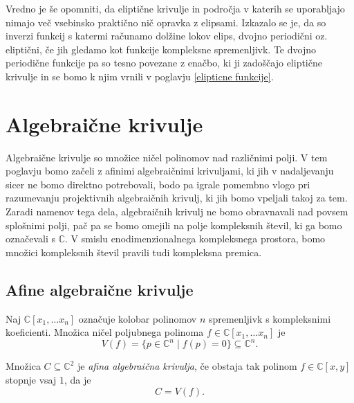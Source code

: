 \documentclass[mat1]{fmfdelo}
\newcommand{\C}{\mathbb C}
\begin{document}
Vredno je še opomniti, da eliptične krivulje in področja v katerih se uporabljajo 
nimajo več vsebinsko praktično nič opravka z elipsami. 
Izkazalo se je, da so inverzi funkcij s katermi računamo dolžine lokov elips, dvojno periodični oz. eliptični,
če jih gledamo kot funkcije kompleksne spremenljivk. Te dvojno periodične funkcije pa so tesno povezane z enačbo,
ki ji zadoščajo eliptične krivulje in se bomo k njim vrnili v poglavju \ref{elipticne funkcije}.


\section{Algebraične krivulje} \label{algebraicne krivulje}
Algebraične krivulje so množice ničel polinomov nad različnimi polji. V tem poglavju bomo začeli 
z afinimi
algebraičnimi krivuljami, ki jih v nadaljevanju sicer ne bomo direktno potrebovali, bodo pa igrale pomembno
vlogo pri razumevanju projektivnih algebraičnih krivulj, ki jih bomo vpeljali takoj za tem. 
Zaradi namenov tega dela, algebraičnih krivulj ne bomo obravnavali nad povsem splošnimi polji, pač pa se
bomo omejili na polje kompleksnih števil, ki ga bomo označevali s $\C$. V smislu enodimenzionalnega kompleksnega prostora, bomo množici kompleksnih števil pravili tudi kompleksna premica.


\subsection{Afine algebraične krivulje} 
Naj $\C[x_1, \dots x_n]$ označuje kolobar polinomov $n$ spremenljivk s
kompleksnimi koeficienti. Množica ničel poljubnega polinoma $f \in \C[x_1, \dots x_n]$ je
$$ V(f) = \{p \in \C^n \mid f(p) = 0 \} \subseteq \C^n.$$

\begin{definicija}
Množica $C \subseteq \C^2$ je \emph{afina algebraična krivulja}, če obstaja tak polinom $f \in \C[x,y]$ stopnje vsaj $1$, da je
\begin{equation*}
    C = V(f).
\end{equation*}
\end{definicija}
\end{document}
